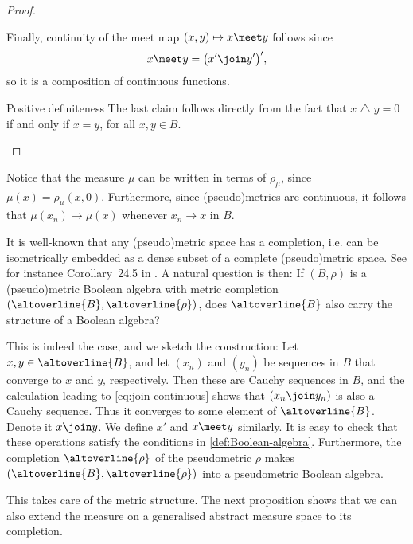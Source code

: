 \documentclass[article, a4paper, 11pt, oneside]{memoir}
\numberwithin{equation}{chapter}
\renewcommand{\symdiff}{\mathbin{\triangle}}
\begin{document}
\begin{proof}
\begin{proofsec}
    Finally, continuity of the meet map $(x,y) \mapsto x \meet y$ follows since
    \begin{equation*}
        x \meet y
            = \bigl( x' \join y' \bigr)',
    \end{equation*}
    so it is a composition of continuous functions.

    \item[Positive definiteness]
    The last claim follows directly from the fact that $x \symdiff y = 0$ if and only if $x = y$, for all $x,y \in B$.
\end{proofsec}
\end{proof}

\begin{remark}
    \label{rem:convergence-of-measure}
    Notice that the measure $\mu$ can be written in terms of $\rho_\mu$, since $\mu(x) = \rho_\mu(x,0)$. Furthermore, since (pseudo)metrics are continuous, it follows that $\mu(x_n) \to \mu(x)$ whenever $x_n \to x$ in $B$.
\end{remark}


It is well-known that any (pseudo)metric space has a completion, i.e. can be isometrically embedded as a dense subset of a complete (pseudo)metric space. See for instance Corollary~24.5 in \textcite{willard}. A natural question is then: If $(B,\rho)$ is a (pseudo)metric Boolean algebra with metric completion $(\altoverline{B}, \altoverline{\rho})$, does $\altoverline{B}$ also carry the structure of a Boolean algebra?

This is indeed the case, and we sketch the construction: Let $x,y \in \altoverline{B}$, and let $(x_n)$ and $(y_n)$ be sequences in $B$ that converge to $x$ and $y$, respectively. Then these are Cauchy sequences in $B$, and the calculation leading to \cref{eq:join-continuous} shows that $(x_n \join y_n)$ is also a Cauchy sequence. Thus it converges to some element of $\altoverline{B}$. Denote it $x \join y$. We define $x'$ and $x \meet y$ similarly. It is easy to check that these operations satisfy the conditions in \cref{def:Boolean-algebra}. Furthermore, the completion $\altoverline{\rho}$ of the pseudometric $\rho$ makes $(\altoverline{B}, \altoverline{\rho})$ into a pseudometric Boolean algebra.

This takes care of the metric structure. The next proposition shows that we can also extend the measure on a generalised abstract measure space to its completion.
\end{document}
